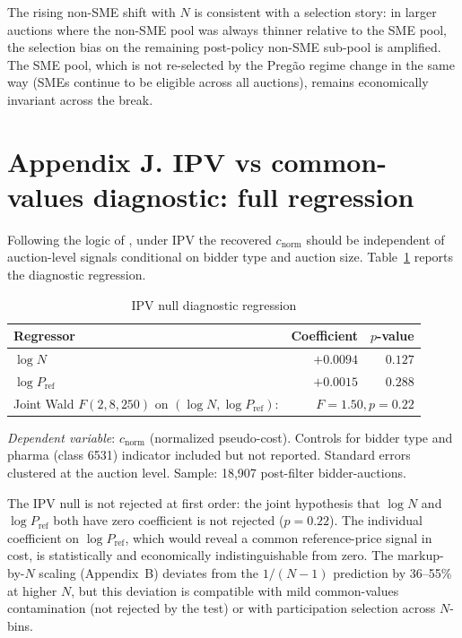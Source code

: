 \documentclass[12pt]{article}
\begin{document}
The rising non-SME shift with $N$ is consistent with a selection
story: in larger auctions where the non-SME pool was always
thinner relative to the SME pool, the selection bias on the
remaining post-policy non-SME sub-pool is amplified. The SME
pool, which is not re-selected by the Preg\~ao regime change in
the same way (SMEs continue to be eligible across all auctions),
remains economically invariant across the break.

\section*{Appendix J. IPV vs common-values diagnostic: full regression}
\label{app:ipv-cv}

Following the logic of \citet{hendricks2003}, under IPV the
recovered $c_{\text{norm}}$ should be independent of
auction-level signals conditional on bidder type and auction
size. Table~\ref{tab:ipv-regression} reports the diagnostic
regression.

\begin{table}[htbp]
\centering
\caption{IPV null diagnostic regression}
\label{tab:ipv-regression}
\small
\begin{tabular}{lrr}
\toprule
Regressor & Coefficient & $p$-value \\
\midrule
$\log N$                        & $+0.0094$  & $0.127$ \\
$\log P_{\text{ref}}$           & $+0.0015$  & $0.288$ \\
\midrule
Joint Wald $F(2, 8{,}250)$ on $(\log N, \log P_{\text{ref}})$: &
 \multicolumn{2}{r}{$F = 1.50, p = 0.22$} \\
\bottomrule
\end{tabular}
\end{table}

\emph{Dependent variable}: $c_{\text{norm}}$ (normalized
pseudo-cost). Controls for bidder type and pharma (class 6531)
indicator included but not reported. Standard errors clustered
at the auction level. Sample: 18,907 post-filter bidder-auctions.

The IPV null is not rejected at first order: the joint
hypothesis that $\log N$ and $\log P_{\text{ref}}$ both have zero
coefficient is not rejected ($p = 0.22$). The individual
coefficient on $\log P_{\text{ref}}$, which would reveal a
common reference-price signal in cost, is statistically and
economically indistinguishable from zero. The markup-by-$N$
scaling (Appendix~B) deviates from the $1/(N-1)$ prediction by
36--55\% at higher $N$, but this deviation is compatible with
mild common-values contamination (not rejected by the test) or
with participation selection across $N$-bins.
\end{document}
